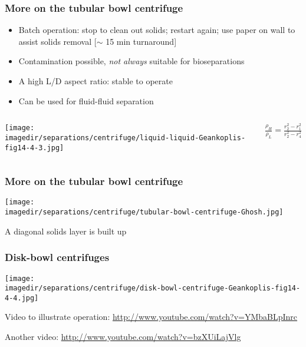 \begin{frame}\frametitle{More on the tubular bowl centrifuge}
	\begin{itemize}	
		\item	Batch operation: stop to clean out solids; restart again; use paper on wall to assist solids removal [$\sim$ 15 min turnaround]
		\item	Contamination possible, \emph{not always} suitable for bioseparations
		\item	A high L/D aspect ratio: stable to operate
		\item	Can be used for fluid-fluid separation
	\end{itemize}	
	\begin{columns}[c]
			\begin{center}
				\texttt{[image: \\imagedir/separations/centrifuge/liquid-liquid-Geankoplis-fig14-4-3.jpg]}
			\end{center}
				$\displaystyle \frac{\rho_H}{\rho_L} = \displaystyle \frac{r_2^2 - r_1^2}{r_2^2 - r_4^2}$				
	\end{columns}
\end{frame}

\begin{frame}\frametitle{More on the tubular bowl centrifuge}
	\begin{center}
		\texttt{[image: \\imagedir/separations/centrifuge/tubular-bowl-centrifuge-Ghosh.jpg]}
	\end{center}
	A diagonal solids layer is built up
	
\end{frame}

\begin{frame}\frametitle{Disk-bowl centrifuges}
	\begin{center}
		\texttt{[image: \\imagedir/separations/centrifuge/disk-bowl-centrifuge-Geankoplis-fig14-4-4.jpg]}
	\end{center}
	
	\vspace{12pt}
	Video to illustrate operation: \href{http://www.youtube.com/watch?v=YMbaBLpInrc}{http://www.youtube.com/watch?v=YMbaBLpInrc}
	
	\vspace{2pt}
	{\tiny Another video: \href{http://www.youtube.com/watch?v=bzXUiLajVlg}{http://www.youtube.com/watch?v=bzXUiLajVlg}}

\end{frame}

